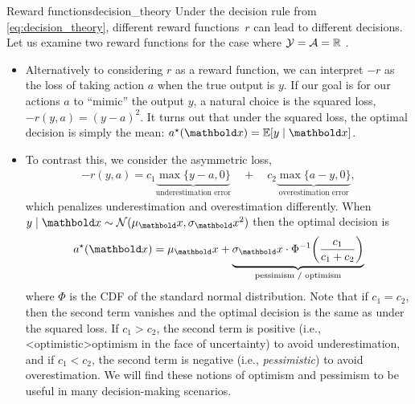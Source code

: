 \begin{ex}{Reward functions}{decision_theory}
  Under the decision rule from \cref{eq:decision_theory}, different reward functions~$r$ can lead to different decisions.
  Let us examine two reward functions for the case where $\mathcal{Y} = \mathcal{A} = \mathbb{R}$ .

  \begin{itemize}
    \item Alternatively to considering $r$ as a reward function, we can interpret $-r$ as the loss of taking action $a$ when the true output is $y$.
    If our goal is for our actions $a$ to ``mimic'' the output $y$, a natural choice is the squared loss, $- r(y, a) = (y - a)^2$.
    It turns out that under the squared loss, the optimal decision is simply the mean: $\opt{a}(\vx) = \E{y \mid \vx}$.
    \item To contrast this, we consider the asymmetric loss, \begin{align*}
      - r(y, a)= c_1 \underbrace{\max\{y-a, 0\}}_{\text{underestimation error}} \quad+\quad c_2 \underbrace{\max\{a-y, 0\}}_{\text{overestimation error}},
    \end{align*} which penalizes underestimation and overestimation differently.
    When $y \mid \vx \sim \N{\mu_\vx}{\sigma_\vx^2}$ then the optimal decision is \begin{align*}
      \opt{a}(\vx) = \mu_\vx + \underbrace{\sigma_\vx \cdot \inv{\Phi}\parentheses*{\frac{c_1}{c_1 + c_2}}}_{\text{pessimism / optimism}}
    \end{align*} where $\Phi$ is the CDF of the standard normal distribution.
    Note that if $c_1 = c_2$, then the second term vanishes and the optimal decision is the same as under the squared loss.
    If $c_1 > c_2$, the second term is positive (i.e., \midx<optimistic>{optimism in the face of uncertainty}) to avoid underestimation, and if $c_1 < c_2$, the second term is negative (i.e., \emph{pessimistic}) to avoid overestimation.
    We will find these notions of optimism and pessimism to be useful in many decision-making scenarios.
  \end{itemize}
\end{ex}

